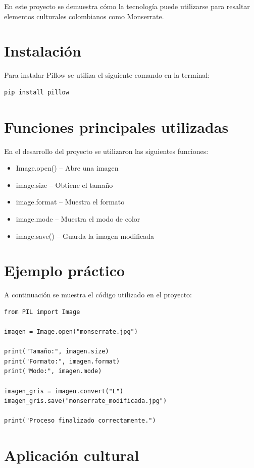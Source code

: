 \documentclass[12pt]{article}
\begin{document}
En este proyecto se demuestra cómo la tecnología puede utilizarse para resaltar elementos culturales colombianos como Monserrate.

\section{Instalación}

Para instalar Pillow se utiliza el siguiente comando en la terminal:

\begin{verbatim}
pip install pillow
\end{verbatim}

\section{Funciones principales utilizadas}

En el desarrollo del proyecto se utilizaron las siguientes funciones:

\begin{itemize}
\item Image.open() -- Abre una imagen
\item image.size -- Obtiene el tamaño
\item image.format -- Muestra el formato
\item image.mode -- Muestra el modo de color
\item image.save() -- Guarda la imagen modificada
\end{itemize}

\section{Ejemplo práctico}

A continuación se muestra el código utilizado en el proyecto:

\begin{verbatim}
from PIL import Image

imagen = Image.open("monserrate.jpg")

print("Tamaño:", imagen.size)
print("Formato:", imagen.format)
print("Modo:", imagen.mode)

imagen_gris = imagen.convert("L")
imagen_gris.save("monserrate_modificada.jpg")

print("Proceso finalizado correctamente.")
\end{verbatim}

\section{Aplicación cultural}
\end{document}
